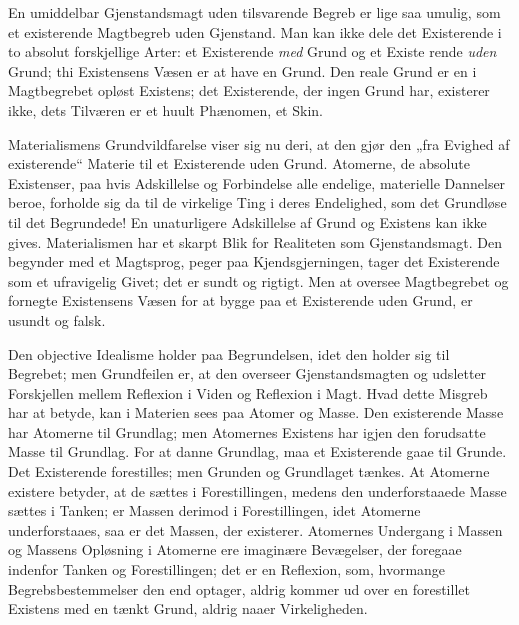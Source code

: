 \documentclass[12pt,a4paper]{book}
\begin{document}
En umiddelbar Gjenstandsmagt uden tilsvarende Begreb er lige saa
umulig, som et existerende Magtbegreb uden Gjenstand. Man kan ikke
dele det Existerende i to absolut forskjellige Arter: et Existerende
\emph{med} Grund og et Existe\-%
rende \emph{uden} Grund; thi Existensens Væsen er at have en Grund.
Den reale Grund er en i Magtbegrebet opløst Existens; det Existerende,
der ingen Grund har, existerer ikke, dets Tilværen er et huult
Phænomen, et Skin.

Materialismens Grundvildfarelse viser sig nu deri, at den gjør den
„fra Evighed af existerende“ Materie til et Existerende uden Grund.
Atomerne, de absolute Existenser, paa hvis Adskillelse og Forbindelse
alle endelige, materielle Dannelser beroe, forholde sig da til de
virkelige Ting i deres Endelighed, som det Grundløse til det
Begrundede! En unaturligere Adskillelse af Grund og Existens kan ikke
gives. Materialismen har et skarpt Blik for Realiteten som
Gjenstandsmagt. Den begynder med et Magtsprog, peger paa
Kjendsgjerningen, tager det Existerende som et ufravigelig Givet; det
er sundt og rigtigt. Men at oversee Magtbegrebet og fornegte
Existensens Væsen for at bygge paa et Existerende uden Grund, er
usundt og falsk.

Den objective Idealisme holder paa Begrundelsen, idet den holder sig
til Begrebet; men Grundfeilen er, at den overseer Gjenstandsmagten og
udsletter Forskjellen mellem Reflexion i Viden og Reflexion i Magt.
Hvad dette Misgreb har at betyde, kan i Materien sees paa Atomer og
Masse. Den existerende Masse har Atomerne til Grundlag; men Atomernes
Existens har igjen den forudsatte Masse til Grundlag. For at danne
Grundlag, maa et Existerende gaae til Grunde. Det Existerende
forestilles; men Grunden og Grundlaget tænkes. At Atomerne existere
betyder, at de sættes i Forestillingen, medens den underforstaaede
Masse sættes i Tanken; er Massen derimod i Forestillingen, idet
Atomerne underforstaaes, saa er det Massen, der existerer. Atomernes
Undergang i Massen og Massens Opløsning i Atomerne ere imaginære
Bevægelser, der foregaae indenfor Tanken og Forestillingen; det er en
Reflexion, som, hvormange Begrebsbestemmelser den end optager, aldrig
kommer ud over en
forestillet Existens med en tænkt Grund, aldrig naaer Virkeligheden.
\end{document}
